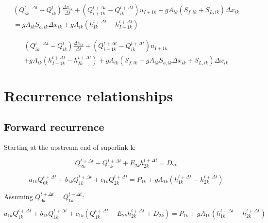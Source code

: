 \documentclass[11pt]{article}
\begin{document}
\begin{equation}
  \begin{split}
    (Q_{ik}^{t + \Delta t} - Q_{ik}^t) \frac{\Delta x_{ik}}{\Delta t} + (Q_{i+1k}^{t + \Delta t} - Q_{ik}^{t + \Delta t}) u_{I+1k} + g A_{ik} (S_{f,ik} + S_{L,ik}) \Delta x_{ik} \\ =
    g A_{ik} S_{o,ik} \Delta x_{ik} + g A_{ik} (h_{Ik}^{t + \Delta t} - h_{I+1k}^{t + \Delta t})
  \end{split}
\end{equation}

\begin{equation}
  \begin{split}
    (Q_{ik}^{t + \Delta t} - Q_{ik}^t) \frac{\Delta x_{ik}}{\Delta t} + (Q_{i+1k}^{t + \Delta t} - Q_{ik}^{t + \Delta t}) u_{I+1k} \\ + g A_{ik} (h_{I+1k}^{t + \Delta t} - h_{Ik}^{t + \Delta t}) + g A_{ik} (S_{f,ik} -
    g A_{ik} S_{o,ik} \Delta x_{ik} + S_{L,ik}) \Delta x_{ik}
  \end{split}
\end{equation}

\section*{Recurrence relationships}

\subsection*{Forward recurrence}

Starting at the upstream end of superlink k:

\begin{equation}
  Q_{2k}^{t + \Delta t} - Q_{1k}^{t + \Delta t} + E_{2k} h_{2k}^{t + \Delta t} = D_{2k}
\end{equation}


\begin{equation}
   a_{1k} Q_{0k}^{t + \Delta t} + b_{1k} Q_{1k}^{t + \Delta t} + c_{1k} Q_{2k}^{t + \Delta t} = P_{1k} + g A_{1k} (h_{1k}^{t + \Delta t} - h_{2k}^{t + \Delta t})
\end{equation}

Assuming $Q_{0k}^{t + \Delta t} = Q_{1k}^{t + \Delta t}$:

\begin{equation}
  a_{1k} Q_{1k}^{t + \Delta t} + b_{1k} Q_{1k}^{t + \Delta t} + c_{1k} (Q_{1k}^{t + \Delta t} - E_{2k} h_{2k}^{t + \Delta t} + D_{2k}) = P_{1k} + g A_{1k} (h_{1k}^{t + \Delta t} - h_{2k}^{t + \Delta t})
\end{equation}
\end{document}
